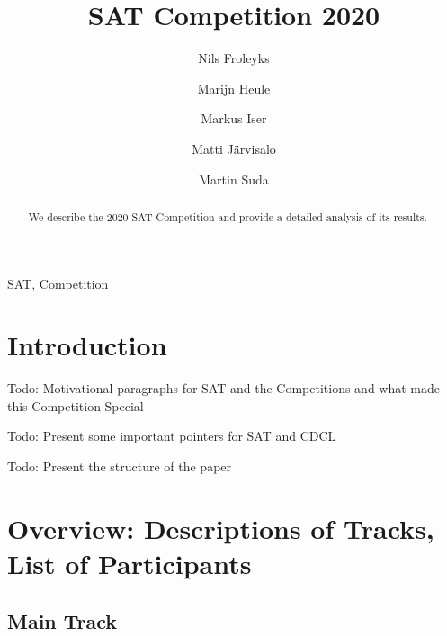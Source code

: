 \documentclass{elsarticle}
\title{SAT Competition 2020\tnoteref{title}}
\author[jku]{Nils Froleyks}
\author[cmu]{Marijn Heule}
\author[kit]{Markus Iser}
\author[hiit]{Matti Järvisalo}
\author[ctu]{Martin Suda}
\newcommand{\todo}[1]{{\color{purple}Todo: #1}}
\begin{document}
\begin{abstract}
We describe the 2020 SAT Competition and provide a detailed analysis of its results.
\end{abstract}

\begin{keyword}
SAT, Competition
\end{keyword}

\maketitle

\section{Introduction}

\todo{Motivational paragraphs for SAT and the Competitions and what made this Competition Special}

\todo{Present some important pointers for SAT and CDCL}

\todo{Present the structure of the paper}


\section{Overview: Descriptions of Tracks, List of Participants}

\subsection{Main Track}


\makeatletter
\newcommand{\stack}[1]{%
    \begin{tabular}{@{}l@{}}#1\checknextarg}
\newcommand{\checknextarg}{\@ifnextchar\bgroup{\gobblenextarg}{ \end{tabular}}}
\newcommand{\gobblenextarg}[1]{\\#1\@ifnextchar\bgroup{\gobblenextarg}{ \end{tabular}}}
\makeatother
\end{document}
